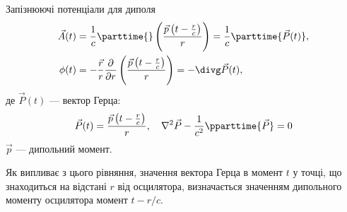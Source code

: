 \documentclass[onlytextwidth]{beamer}
\let\vect\vec
\begin{document}
\begin{frame}{Запізнюючі потенціали для диполя}{}
	\begin{align*}
		\vect{A}(t) & = \frac1c \parttime{}\left( \frac{\vect{p}\left(t - \frac{r}{c}\right)}{r} \right)  = \frac1c \parttime{\vect{P}(t)},                \\
		\phi(t)     & = -\frac{\vect{r}}{r} \frac{\partial}{\partial r}\left( \frac{\vect{p}\left(t - \frac{r}{c}\right)}{r} \right) =  -\divg\vect{P}(t),
	\end{align*}
	де $ \vect{P}(t) $ --- вектор Герца:
	\begin{equation*}
		\vect{P}(t) = \frac{\vect{p}\left(t - \frac{r}{c}\right)}{r}, \quad \nabla^2\vect{P} - \frac{1}{c^2}\pparttime{\vect{P}} = 0
	\end{equation*}
	$ \vect{p} $ --- дипольний момент.

	\begin{block}{}\small\justifying
		Як випливає з цього рівняння, значення вектора Герца в
		момент $ t $ у точці, що знаходиться на відстані $ r $ від осцилятора,
		визначається значенням дипольного моменту осцилятора
		момент $ t - r / c $.
	\end{block}{}
\end{frame}
\end{document}
